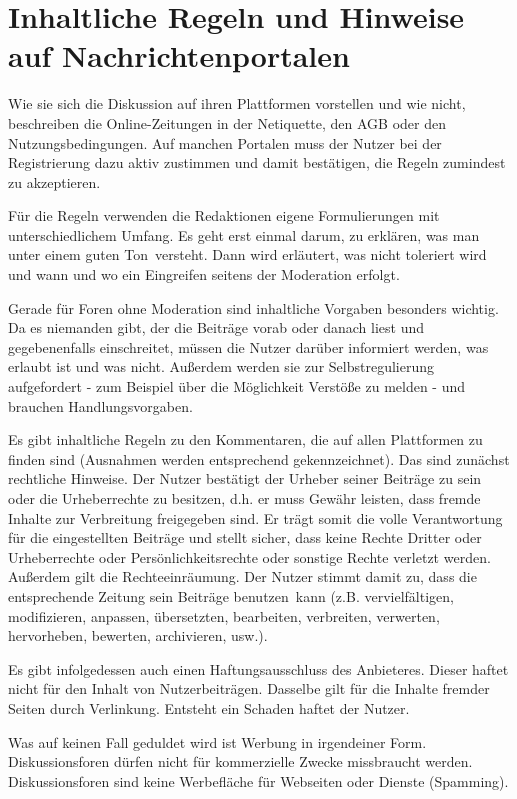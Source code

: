 
\section{Inhaltliche Regeln und Hinweise auf Nachrichtenportalen}

Wie sie sich die Diskussion auf ihren Plattformen vorstellen und wie nicht,
beschreiben die Online-Zeitungen in der Netiquette, den AGB oder den
Nutzungsbedingungen. Auf manchen Portalen muss der Nutzer bei der Registrierung
dazu aktiv zustimmen und damit bestätigen, die Regeln zumindest zu akzeptieren.

Für die Regeln verwenden die Redaktionen eigene Formulierungen mit
unterschiedlichem Umfang. Es geht erst einmal darum, zu erklären, was man unter
einem \glqq guten Ton\grqq\ versteht. Dann wird erläutert, was nicht toleriert
wird und wann und wo ein Eingreifen seitens der Moderation erfolgt.

Gerade für Foren ohne Moderation sind inhaltliche Vorgaben besonders wichtig. Da
es niemanden gibt, der die Beiträge vorab oder danach liest und gegebenenfalls
einschreitet, müssen die Nutzer darüber informiert werden, was erlaubt ist und
was nicht. Außerdem werden sie zur Selbstregulierung aufgefordert - zum Beispiel
über die Möglichkeit Verstöße zu melden - und brauchen Handlungsvorgaben.

Es gibt inhaltliche Regeln zu den Kommentaren, die auf allen Plattformen zu
finden sind (Ausnahmen werden entsprechend gekennzeichnet).  Das sind zunächst
rechtliche Hinweise. Der Nutzer bestätigt der Urheber seiner Beiträge zu sein
oder die Urheberrechte zu besitzen, d.h. er muss Gewähr leisten, dass fremde
Inhalte zur Verbreitung freigegeben sind. Er trägt somit die volle Verantwortung
für die eingestellten Beiträge und stellt sicher, dass keine Rechte Dritter oder
Urheberrechte oder Persönlichkeitsrechte oder sonstige Rechte verletzt werden.
Außerdem gilt die Rechteeinräumung. Der Nutzer stimmt damit zu, dass die
entsprechende Zeitung sein Beiträge \glqq benutzen\grqq\ kann (z.B. vervielfältigen,
modifizieren, anpassen, übersetzten, bearbeiten, verbreiten, verwerten,
hervorheben, bewerten, archivieren, usw.).

Es gibt infolgedessen auch einen Haftungsausschluss des Anbieteres. Dieser
haftet nicht für den Inhalt von Nutzerbeiträgen. Dasselbe gilt für die Inhalte
fremder Seiten durch Verlinkung. Entsteht ein Schaden haftet der Nutzer.

Was auf keinen Fall geduldet wird ist Werbung in irgendeiner Form.
Diskussionsforen dürfen nicht für kommerzielle Zwecke missbraucht werden.
Diskussionsforen sind keine Werbefläche für Webseiten oder Dienste (Spamming).

